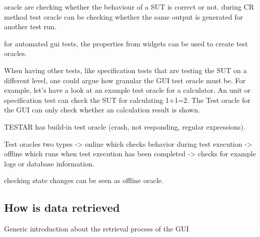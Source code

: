     oracle are checking whether the behaviour of a SUT is correct or not\cite{testOracles}. during CR method test oracle can be checking whether the same output is generated for another test run. 
    
    for automated gui tests, the properties from widgets can be used to create test oracles. 
    
    When having other tests, like specification tests that are testing the SUT on a different level, one could argue how granular the GUI test oracle must be. For example, let's have a look at an example test oracle for a calculator. An unit or specification test can check the SUT for calculating 1+1=2. The Test oracle for the GUI can only check whether an calculation result is shown.  
    
    TESTAR has build-in test oracle (crash, not responding, regular expressions).  
    
    Test oracles two types -> online which checks behavior during test execution -> offline which runs when test execution has been completed -> checks for example logs or database information.
    
    checking state changes can be seen as offline oracle. 
     
 

\subsection{How is data retrieved}

    Generic introduction about the retrieval process of the GUI

    


